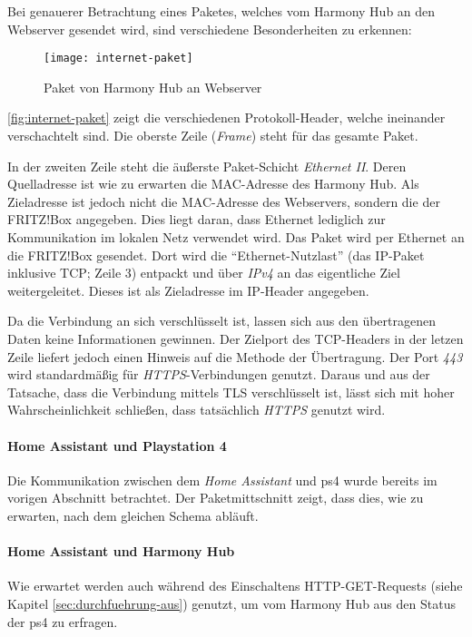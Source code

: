 Bei genauerer Betrachtung eines Paketes, welches vom Harmony Hub an den Webserver gesendet wird,
sind verschiedene Besonderheiten zu erkennen:

\begin{figure}[h!]
    \centering
    \texttt{[image: internet-paket]}
    \caption{Paket von Harmony Hub an Webserver}\label{fig:internet-paket}
\end{figure}


\autoref{fig:internet-paket} zeigt die verschiedenen Protokoll-Header, welche ineinander verschachtelt sind.
Die oberste Zeile (\textit{Frame}) steht für das gesamte Paket.

In der zweiten Zeile steht die äußerste Paket-Schicht \textit{Ethernet II}.
Deren Quelladresse ist wie zu erwarten die MAC-Adresse des Harmony Hub.
Als Zieladresse ist jedoch nicht die MAC-Adresse des Webservers,
sondern die der FRITZ!Box angegeben.
Dies liegt daran, dass Ethernet lediglich zur Kommunikation im lokalen Netz verwendet wird.
Das Paket wird per Ethernet an die FRITZ!Box gesendet.
Dort wird die \enquote{Ethernet-Nutzlast} (das IP-Paket inklusive TCP; Zeile 3) entpackt und über \textit{IPv4} an das eigentliche Ziel weitergeleitet.
Dieses ist als Zieladresse im IP-Header angegeben.

Da die Verbindung an sich verschlüsselt ist, lassen sich aus den übertragenen Daten keine Informationen gewinnen.
Der Zielport des TCP-Headers in der letzen Zeile liefert jedoch einen Hinweis auf die Methode der Übertragung.
Der Port \textit{443} wird standardmäßig für \textit{HTTPS}-Verbindungen genutzt.
Daraus und aus der Tatsache, dass die Verbindung mittels TLS verschlüsselt ist,
lässt sich mit hoher Wahrscheinlichkeit schließen, dass tatsächlich \textit{HTTPS} genutzt wird.

\newpage

\paragraph{Home Assistant und Playstation 4}
Die Kommunikation zwischen dem \textit{Home Assistant} und \ac{ps4} wurde bereits im vorigen Abschnitt betrachtet.
Der Paketmittschnitt zeigt, dass dies, wie zu erwarten, nach dem gleichen Schema abläuft.

\paragraph{Home Assistant und Harmony Hub}
Wie erwartet werden auch während des Einschaltens HTTP-GET-Requests (siehe Kapitel \ref{sec:durchfuehrung-aus}) genutzt,
um vom Harmony Hub aus den Status der \ac{ps4} zu erfragen.

